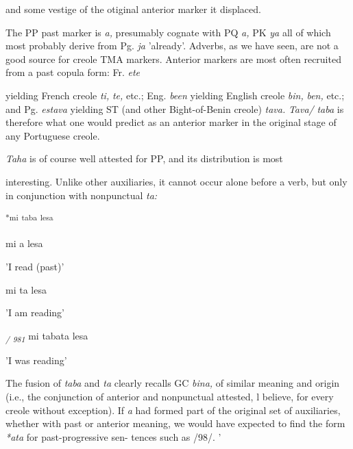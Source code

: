 and some vestige of the otiginal anterior marker it displaced.

The PP past marker is \textit{a,} presumably cognate with PQ \textit{a,} PK \textit{ya} all of which most probably derive from Pg. \textit{ja }'already'. Adverbs, as we have seen, are not a good source for creole TMA markers. Anterior markers are most often recruited from a past copula form: Fr. \textit{ete}

yielding French creole \textit{ti,} \textit{te,} etc.; Eng. \textit{been} yielding English creole \textit{bin,} \textit{ben,} etc.; and Pg. \textit{estava} yielding ST (and other Bight-of-Benin creole) \textit{tava.} \textit{Tava/} \textit{taba} is therefore what one would predict as an anterior marker in the original stage of any Portuguese creole.

\textit{Taha} is of course well attested for PP, and its distribution is most

interesting. Unlike other auxiliaries, it cannot occur alone before a verb, but only in conjunction with nonpunctual \textit{ta:}

\ea\label{ex:95}
 \textsuperscript{*mi} \textsuperscript{taba} \textsuperscript{lesa}
\glt
\z

\ea\label{ex:96}
mi a lesa
\glt
\z

'I read (past)'

\ea\label{ex:97}
mi ta lesa
\glt
\z

'I am reading'

\textit{\textsubscript{/}}\textsubscript{ }\textit{\textsubscript{981 }}mi tabata lesa

'I was reading'

The fusion of \textit{taba} and \textit{ta} clearly recalls GC \textit{bina,} of similar meaning and origin (i.e., the conjunction of anterior and nonpunctual attested, l believe, for every creole without exception). If \textit{a} had formed part of the original set of auxiliaries, whether with past or anterior meaning, we would have expected to find the form \textit{*ata} for past-progressive sen- tences such as /98/. '


